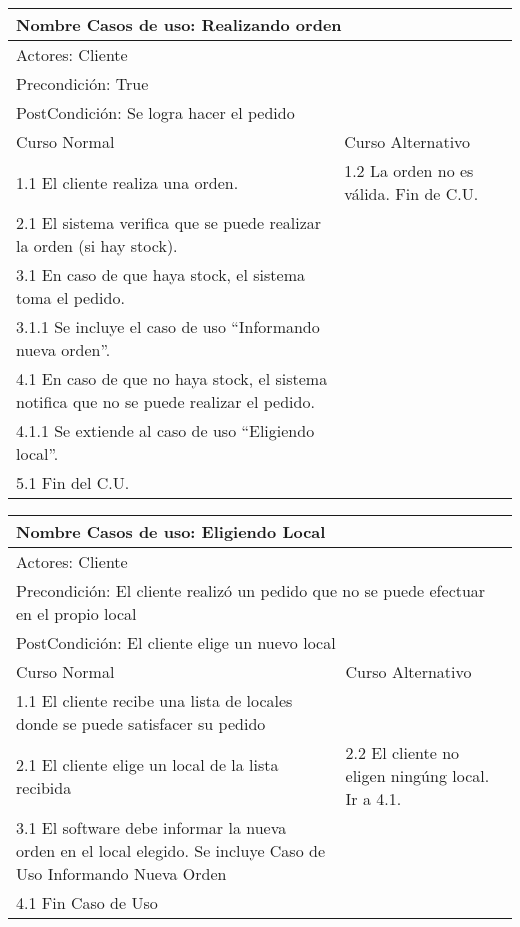 \documentclass[a4paper,10pt]{article}
\begin{document}
\begin{center}
\begin{tabularx}{14cm}{|X|X|}
\hline
\multicolumn{2}{|l|}{Nombre Casos de uso: Realizando orden}\\
\hline
\multicolumn{2}{|l|}{Actores: Cliente}\\
\hline
\multicolumn{2}{|l|}{Precondici\'on: True}\\
\hline
\multicolumn{2}{|l|}{PostCondici\'on: Se logra hacer el pedido}\\
\hline
Curso Normal & Curso Alternativo\\
\hline
1.1 El cliente realiza una orden. & 1.2 La orden no es válida. Fin de C.U.
\\
\hline
2.1 El sistema verifica que se puede realizar la orden (si hay stock). &
\\
\hline
3.1 En caso de que haya stock, el sistema toma el pedido. &
\\
\hline
3.1.1 Se incluye el caso de uso ``Informando nueva orden''. &
\\
\hline
4.1 En caso de que no haya stock, el sistema notifica que no se puede realizar el pedido. &
\\
\hline
4.1.1 Se extiende al caso de uso ``Eligiendo local''. &
\\
\hline
5.1 Fin del C.U. & \\
\hline
\end{tabularx}
\end{center}


\bigskip

\begin{center}
\begin{tabularx}{14cm}{|X|X|}
\hline
\multicolumn{2}{|l|}{Nombre Casos de uso: Eligiendo Local}\\
\hline
\multicolumn{2}{|l|}{Actores: Cliente}\\
\hline
\multicolumn{2}{|l|}{Precondici\'on: El cliente realiz\'o un pedido que no se puede efectuar en el propio local}\\
\hline
\multicolumn{2}{|l|}{PostCondici\'on: El cliente elige un nuevo local}\\
\hline
Curso Normal & Curso Alternativo\\
\hline
1.1 El cliente recibe una lista de locales donde se puede satisfacer su pedido & 
\\
\hline
2.1 El cliente elige un local de la lista recibida & 2.2 El cliente no eligen ning\'ung local. Ir a 4.1.
\\
\hline
3.1 El software debe informar la nueva orden en el local elegido. Se incluye Caso de Uso Informando Nueva Orden &
\\
\hline
4.1 Fin Caso de Uso &
\\
\hline
\end{tabularx}
\end{center}
\end{document}
